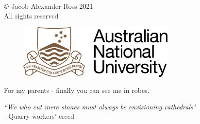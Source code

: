 \vfill
\begin{center}
\small{$\copyright$ Jacob Alexander Ross 2021\\
All rights reserved}
\end{center}

\mbox{}
\begin{figure}[b]
\begin{center}
\includegraphics[width=0.7\textwidth]{fig/ANU_logo_temp}
\end{center}
\end{figure}





\newpage
\noindent\large{For my parents - finally you can see me in robes.}\newline
\mbox{}
\vfill
\begin{flushright}
\large{\emph{``We who cut mere stones must always be envisioning cathedrals"\\} 
- Quarry workers' creed}
\end{flushright}






\cleardoublepage
